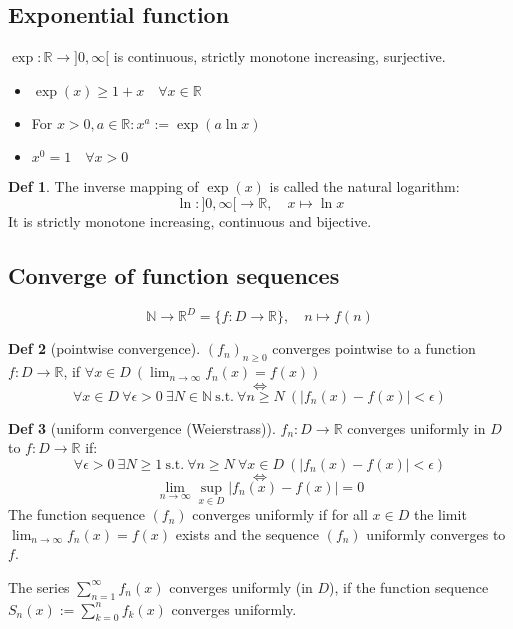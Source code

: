 \documentclass[a4paper, 10pt]{article}
\theoremstyle{definition}
\newtheorem*{definition}{Def}
\theoremstyle{named}
\newcommand{\R}{\mathbb{R}}
\newcommand{\N}{\mathbb{N}}
\begin{document}
\subsection{Exponential function}
$\exp: \R \to ]0, \infty [$ is continuous, strictly monotone increasing, surjective.
\begin{itemize}
    \item $\exp(x) \geq 1 + x \quad \forall x \in \R$
    \item For $x > 0, a \in \R: x^a := \exp(a \ln x)$
    \item $x^0 = 1 \quad \forall x > 0$
\end{itemize}

\begin{definition}
    The inverse mapping of $\exp (x)$ is called the natural logarithm: 
    $$\ln : ]0, \infty [ \to \R, \quad x \mapsto \ln x$$
    It is strictly monotone increasing, continuous and bijective.
\end{definition}

\subsection{Converge of function sequences}
$$\N \to \R^D = \{f: D \to \R\}, \quad n \mapsto f(n)$$
\begin{definition} [pointwise convergence]
    $(f_n)_{n \geq 0}$ converges pointwise to a function $f: D \to \R$, if $\forall x \in D \ (\lim_{n \to \infty} f_n(x) = f(x))$
    $$\iff$$
    $$\forall x \in D \ \forall \epsilon > 0 \ \exists N \in \N \ \text{s.t.} \ \forall n \geq N \ (|f_n(x) - f(x)| < \epsilon)$$
\end{definition}

\begin{definition}[uniform convergence (Weierstrass)]
    $f_n: D \to \R$ converges uniformly in $D$ to $f: D \to \R$ if: 
    $$\forall \epsilon > 0 \ \exists N \geq 1 \ \text{s.t.} \ \forall n \geq N \ \forall x \in D \ (|f_n(x) - f(x)| < \epsilon)$$
    $$\iff$$
    $$\lim_{n\to\infty} \sup_{x \in D} |f_n(x) - f(x)| = 0$$
    The function sequence $(f_n)$ converges uniformly if for all $x \in D$ the limit $\lim_{n\to\infty} f_n(x) = f(x)$ exists and the sequence $(f_n)$ uniformly converges to $f$.

    The series $\sum_{n = 1}^\infty f_n(x)$ converges uniformly (in $D$), if the function sequence $S_n(x) := \sum_{k=0}^n f_k(x)$ converges uniformly.
\end{definition}
\end{document}
